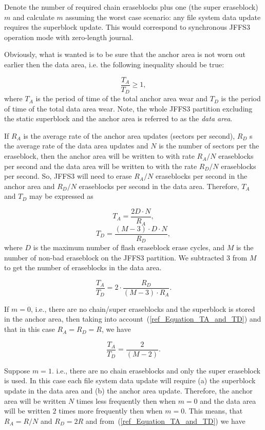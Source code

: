 Denote the number of required chain eraseblocks plus one (the super
eraseblock) $m$ and calculate $m$ assuming the worst case scenario: any
file system data update requires the superblock update. This would correspond
to synchronous JFFS3 operation mode with \mbox{zero-length} journal.

Obviously, what is wanted is to be sure that the anchor area is not worn out
earlier then the data area, i.e. the following inequality should be true:

\begin{equation}
\frac{T_A}{T_D} \geqslant 1,
\label{ref_EquationSBIneq}
\end{equation}
where $T_A$ is the period of time of the total anchor area wear and $T_D$ is
the period of time of the total data area wear. Note, the whole JFFS3 partition
excluding the static superblock and the anchor area is referred to as the
\emph{data area}.

If $R_A$ is the average rate of the anchor area updates (sectors per second),
$R_D$ s the average rate of the data area updates and $N$ is the number of
sectors per the eraseblock, then the anchor area will be written to with rate
$R_A/N$ eraseblocks per second and the data area will be written to with the
rate $R_D/N$ eraseblocks per second. So, JFFS3 will need to erase $R_A/N$
eraseblocks per second in the anchor area and $R_D/N$ eraseblocks per second in
the data area. Therefore, $T_A$ and $T_D$ may be expressed as

$$
T_A = \frac{2D \cdot N}{R_A},
$$
$$
T_D = \frac{(M-3) \cdot D \cdot N}{R_D},
$$
where $D$ is the maximum number of flash eraseblock erase cycles, and $M$ is
the number of non-bad eraseblock on the JFFS3 partition. We subtracted 3 from
$M$ to get the number of eraseblocks in the data area.

\begin{equation}
\frac{T_A}{T_D} = 2 \cdot \frac{R_D}{(M-3) \cdot R_A}.
\label{ref_Equation_TA_and_TD}
\end{equation}

If $m = 0$, i.e., there are no chain/super eraseblocks and the superblock is
stored in the anchor area, then taking into
account~(\ref{ref_Equation_TA_and_TD}) and that in this case $R_A = R_D = R$,
we have

$$
\frac{T_A}{T_D} = \frac{2}{(M-2)}.
$$

Suppose $m = 1$. i.e., there are no chain eraseblocks and only the super
eraseblock is used. In this case each file system data update will require (a)
the superblock update in the data area and (b) the anchor area update.
Therefore, the anchor area will be written $N$ times less frequently then when
$m = 0$ and the data area will be written $2$ times more frequently then when
$m = 0$. This means, that $R_A = R/N$ and $R_D = 2R$ and
from~(\ref{ref_Equation_TA_and_TD}) we have

